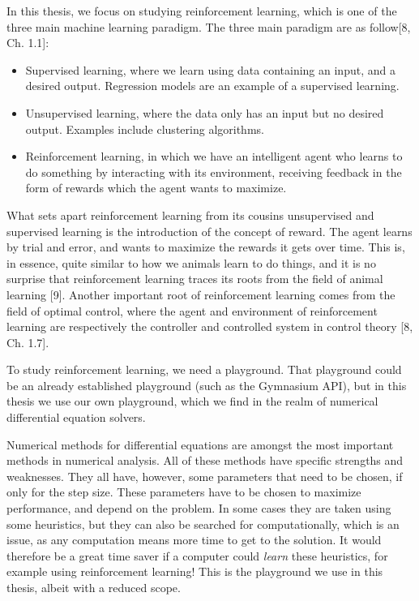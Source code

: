 \documentclass[
  letterpaper,
]{report}
\providecommand{\tightlist}{%
  \setlength{\itemsep}{0pt}\setlength{\parskip}{0pt}}\usepackage{longtable,booktabs,array}
\theoremstyle{plain}
\theoremstyle{definition}
\theoremstyle{definition}
\theoremstyle{remark}
\begin{document}
In this thesis, we focus on studying reinforcement learning, which is
one of the three main machine learning paradigm. The three main paradigm
are as follow{[}8, Ch. 1.1{]}:

\begin{itemize}
\tightlist
\item
  Supervised learning, where we learn using data containing an input,
  and a desired output. Regression models are an example of a supervised
  learning.
\item
  Unsupervised learning, where the data only has an input but no desired
  output. Examples include clustering algorithms.
\item
  Reinforcement learning, in which we have an intelligent agent who
  learns to do something by interacting with its environment, receiving
  feedback in the form of rewards which the agent wants to maximize.
\end{itemize}

What sets apart reinforcement learning from its cousins unsupervised and
supervised learning is the introduction of the concept of reward. The
agent learns by trial and error, and wants to maximize the rewards it
gets over time. This is, in essence, quite similar to how we animals
learn to do things, and it is no surprise that reinforcement learning
traces its roots from the field of animal learning {[}9{]}. Another
important root of reinforcement learning comes from the field of optimal
control, where the agent and environment of reinforcement learning are
respectively the controller and controlled system in control theory
{[}8, Ch. 1.7{]}.

To study reinforcement learning, we need a playground. That playground
could be an already established playground (such as the Gymnasium API),
but in this thesis we use our own playground, which we find in the realm
of numerical differential equation solvers.

Numerical methods for differential equations are amongst the most
important methods in numerical analysis. All of these methods have
specific strengths and weaknesses. They all have, however, some
parameters that need to be chosen, if only for the step size. These
parameters have to be chosen to maximize performance, and depend on the
problem. In some cases they are taken using some heuristics, but they
can also be searched for computationally, which is an issue, as any
computation means more time to get to the solution. It would therefore
be a great time saver if a computer could \emph{learn} these heuristics,
for example using reinforcement learning! This is the playground we use
in this thesis, albeit with a reduced scope.
\end{document}

